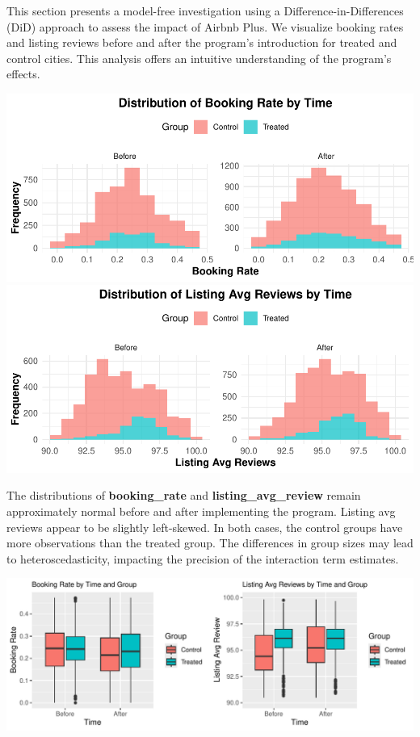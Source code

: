 \documentclass[
  12pt,
]{article}
\begin{document}
This section presents a model-free investigation using a
Difference-in-Differences (DiD) approach to assess the impact of Airbnb
Plus. We visualize booking rates and listing reviews before and after
the program's introduction for treated and control cities. This analysis
offers an intuitive understanding of the program's effects.

\includegraphics{assignment2_final_2_files/figure-latex/unnamed-chunk-12-1.pdf}
\includegraphics{assignment2_final_2_files/figure-latex/unnamed-chunk-12-2.pdf}

The distributions of \textbf{booking\_rate} and
\textbf{listing\_avg\_review} remain approximately normal before and
after implementing the program. Listing avg reviews appear to be
slightly left-skewed. In both cases, the control groups have more
observations than the treated group. The differences in group sizes may
lead to heteroscedasticity, impacting the precision of the interaction
term estimates.

\includegraphics{assignment2_final_2_files/figure-latex/unnamed-chunk-14-1.pdf}
\end{document}
